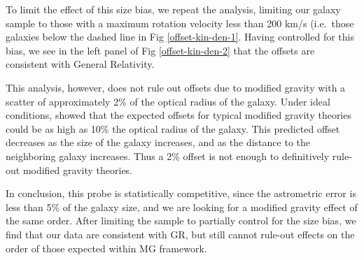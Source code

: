 \documentclass[useAMS,usenatbib,twocolumn]{mn2e}
\begin{document}
To limit the effect of this size bias, we repeat the analysis, limiting our
galaxy sample to those with a maximum rotation velocity less than
200 km/s (i.e.\ those galaxies below the dashed line in
Fig \ref{offset-kin-den-1}.  Having controlled for this bias, we see in
the left panel of Fig \ref{offset-kin-den-2} that the offsets are consistent
with General Relativity.

This analysis, however, does not rule out offsets due to modified gravity
with a scatter of approximately 2\% of the optical radius of the galaxy.
Under ideal conditions, \citet{bhuvjake2011} showed that the expected
offsets for typical modified gravity theories could be as high as 10\% the
optical radius of the galaxy.  This predicted offset decreases as the size
of the galaxy increases, and as the distance to the neighboring galaxy
increases.  Thus a 2\% offset is not enough to definitively
rule-out modified gravity theories.

In conclusion, this probe is statistically competitive, since the astrometric
error is less than 5\% of the galaxy size, and we are looking for a modified
gravity effect of the same order.  After limiting the sample to partially
control for the size bias, we find that our data are consistent with GR,
but still cannot rule-out effects on the order of those expected within
 MG framework.
\end{document}
